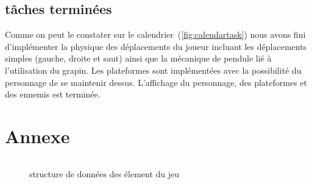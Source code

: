 \documentclass{article}
\begin{document}
\subsection{tâches terminées}
Comme on peut le constater sur le calendrier~(\ref{fig:calendartask}) nous avons fini d'implémenter la physique des déplacements du joueur incluant les déplacements simples 
(gauche, droite et saut) ainsi que la mécanique de pendule lié à l'utilisation du grapin. Les plateformes sont implémentées avec la possibilité du personnage de se maintenir 
dessus. L'affichage du personnage, des plateformes et des ennemis est terminée.

\section{Annexe}
\label{Ocaml structure}
\FloatBarrier
\begin{figure}[H]
  \hrulefill
  \inputminted{OCaml}{structure.ml}
  \caption{structure de données des élement du jeu}
  
  \hrulefill
  \end{figure}
\end{document}
